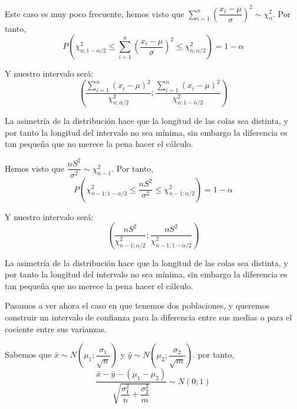 Este caso es muy poco frecuente, hemos visto que $\sum_{i=1}^n\left(\dfrac{x_i-\mu}{\sigma}\right)^2\sim\chi^2_{n}$. Por tanto, 
\begin{equation*}
P(\chi^2_{n;1-\alpha/2}\leq\sum_{i=1}^n\left(\dfrac{x_i-\mu}{\sigma}\right)^2\leq\chi^2_{n;\alpha/2})=1-\alpha
\end{equation*}

Y nuestro intervalo ser\'a:
\begin{equation*}
\left(\dfrac{\sum_{i=1}^n\left(x_i-\mu\right)^2}{\chi^2_{n;\alpha/2}};\dfrac{\sum_{i=1}^n\left(x_i-\mu\right)^2}{\chi^2_{n;1-\alpha/2}}\right)
\end{equation*}

La asimetr\'ia de la distribuci\'on hace que la longitud de las colas sea distinta, y por tanto la longitud del intervalo no sea m\'inima, sin embargo la diferencia es tan peque\~na que no merece la pena hacer el c\'alculo.


Hemos visto que $\dfrac{nS^2}{\sigma^2}\sim\chi^2_{n-1}$. Por tanto, 
\begin{equation*}
P(\chi^2_{n-1;1-\alpha/2}\leq\dfrac{nS^2}{\sigma^2}\leq\chi^2_{n-1;\alpha/2})=1-\alpha
\end{equation*}

Y nuestro intervalo ser\'a:
\begin{equation*}
\left(\dfrac{nS^2}{\chi^2_{n-1;\alpha/2}};\dfrac{nS^2}{\chi^2_{n-1;1-\alpha/2}}\right)
\end{equation*}

La asimetr\'ia de la distribuci\'on hace que la longitud de las colas sea distinta, y por tanto la longitud del intervalo no sea m\'inima, sin embargo la diferencia es tan peque\~na que no merece la pena hacer el c\'alculo.

Pasamos a ver ahora el caso en que tenemos dos poblaciones, y queremos construir un intervalo de confianza para la diferencia entre sus medias o para el cociente entre sus varianzas.


Sabemos que $\bar{x}\sim N(\mu_1;\dfrac{\sigma_1}{\sqrt{n}})$ y $\bar{y}\sim N(\mu_2;\dfrac{\sigma_2}{\sqrt{m}})$. por tanto,
\begin{equation*}
\dfrac{\bar{x}-\bar{y}-(\mu_1-\mu_2)}{\sqrt{\dfrac{\sigma_1^2}{n}+\dfrac{\sigma_2^2}{m}}}\sim N(0;1)
\end{equation*}

